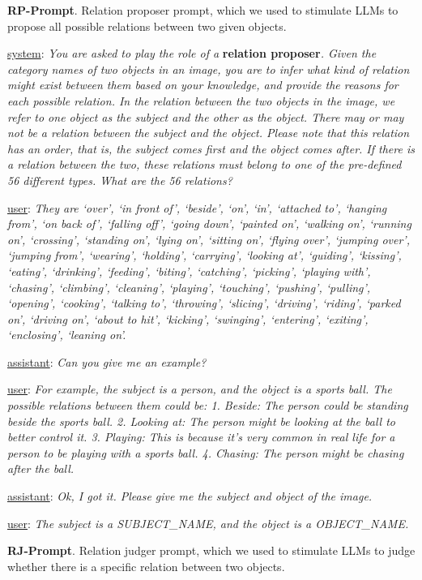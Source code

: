 \noindent \textbf{RP-Prompt}.
Relation proposer prompt, which we used to stimulate LLMs to propose all possible relations between two given objects.

\underline{system}: \textit{You are asked to play the role of a} \textbf{relation proposer}\textit{. Given the category names of two objects in an image, you are to infer what kind of relation might exist between them based on your knowledge, and provide the reasons for each possible relation. In the relation between the two objects in the image, we refer to one object as the subject and the other as the object. There may or may not be a relation between the subject and the object. Please note that this relation has an order, that is, the subject comes first and the object comes after. If there is a relation between the two, these relations must belong to one of the pre-defined 56 different types. What are the 56 relations?}

\underline{user}: \textit{They are `over', `in front of', `beside', `on', `in', `attached to', `hanging from', `on back of', `falling off', `going down', `painted on', `walking on', `running on', `crossing', `standing on', `lying on', `sitting on', `flying over', `jumping over', `jumping from', `wearing', `holding', `carrying', `looking at', `guiding', `kissing', `eating', `drinking', `feeding', `biting', `catching', `picking', `playing with', `chasing', `climbing', `cleaning', `playing', `touching', `pushing', `pulling', `opening', `cooking', `talking to', `throwing', `slicing', `driving', `riding', `parked on', `driving on', `about to hit', `kicking', `swinging', `entering', `exiting', `enclosing', `leaning on'.}

\underline{assistant}: \textit{Can you give me an example?}

\underline{user}: \textit{For example, the subject is a person, and the object is a sports ball. The possible relations between them could be: 1. Beside: The person could be standing beside the sports ball. 2. Looking at: The person might be looking at the ball to better control it. 3. Playing: This is because it's very common in real life for a person to be playing with a sports ball. 4. Chasing: The person might be chasing after the ball.}

\underline{assistant}: \textit{Ok, I got it. Please give me the subject and object of the image.}

\underline{user}: \textit{The subject is a SUBJECT\_NAME, and the object is a OBJECT\_NAME.}


\noindent \textbf{RJ-Prompt}.
Relation judger prompt, which we used to stimulate LLMs to judge whether there is a specific relation between two objects.

